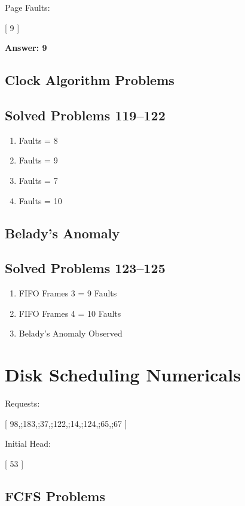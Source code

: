 Page Faults:

[
9
]

\textbf{Answer: 9}

\subsection{Clock Algorithm Problems}

\subsection{Solved Problems 119--122}

\begin{enumerate}
\item Faults = 8
\item Faults = 9
\item Faults = 7
\item Faults = 10
\end{enumerate}

\subsection{Belady's Anomaly}

\subsection{Solved Problems 123--125}

\begin{enumerate}
\item FIFO Frames 3 = 9 Faults
\item FIFO Frames 4 = 10 Faults
\item Belady's Anomaly Observed
\end{enumerate}

\section{Disk Scheduling Numericals}

Requests:

[
98,;183,;37,;122,;14,;124,;65,;67
]

Initial Head:

[
53
]

\subsection{FCFS Problems}


